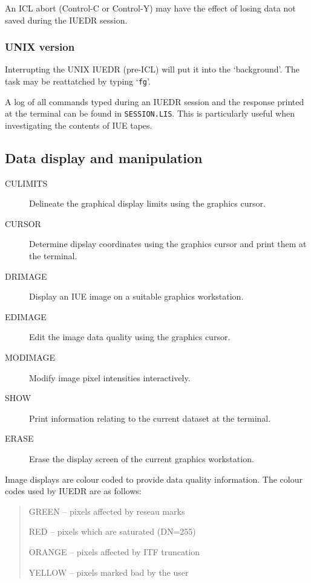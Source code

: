 An ICL abort (Control-C or Control-Y) may have the effect of losing
data not saved during the IUEDR session.

\subsubsection{UNIX version}

Interrupting the UNIX IUEDR (pre-ICL) will put it into the
`background'. The task may be reattatched by typing `{\tt fg}'.

A log of all commands typed during an IUEDR session and the response
printed at the terminal can be found in {\tt SESSION.LIS}.  This is
particularly useful when investigating the contents of IUE tapes. 

\subsection {Data display and manipulation}

\begin {description}

\item [CULIMITS] Delineate the graphical display limits using the
graphics cursor. 

\item [CURSOR] Determine dipslay coordinates using the graphics cursor
and print them at the terminal. 

\item [DRIMAGE] Display an IUE image on a suitable graphics
workstation.

\item [EDIMAGE] Edit the image data quality using the graphics cursor.

\item [MODIMAGE] Modify image pixel intensities interactively.

\item [SHOW] Print information relating to the current dataset at the
terminal.

\item [ERASE] Erase the display screen of the current graphics
workstation.

\end {description}

Image displays are colour coded to provide data quality information.
The  colour codes used by IUEDR are as follows:

\begin {quote}
\begin {description}
\item GREEN -- pixels affected by reseau marks
\item RED -- pixels which are saturated (DN=255)
\item ORANGE -- pixels affected by ITF truncation
\item YELLOW -- pixels marked bad by the user
\end {description}
\end {quote}

